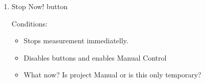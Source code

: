 \begin{enumerate}
\item Stop Now! button

Conditions:
\begin{itemize}
\item Stops measurement immediatelly.
\item Disables buttons and enables Manual Control
\item What now? Is project Manual or is this only temporary?
\end{itemize}

\end{enumerate}